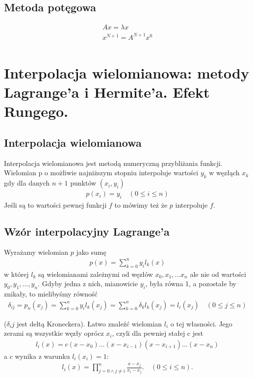 \documentclass[12pt]{article}
\begin{document}
    \subsection{Metoda potęgowa}
    \begin{align*}
        Ax = \lambda x\\
        x^{N+1} = A^{N+1} x^0\\
    \end{align*}

    \newpage

    \section{Interpolacja wielomianowa: metody Lagrange'a i Hermite'a. Efekt Rungego.}

    \subsection{Interpolacja wielomianowa}

    Interpolacja wielomianowa jest metodą numeryczną przybliżania funkcji.
    Wielomian p o możłiwie najniższym stopniu interpoluje wartości $y_k$ w węzłąch $x_k$ gdy dla danych $n+1$ punktów $(x_i, y_i)$
    \begin{align*}
        p(x_i)=y_i  \quad (0\leq i \leq n)
    \end{align*}
    Jeśli są to wartości pewnej funkcji $f$ to mówimy też że $p$ interpoluje $f$.

    \subsection{Wzór interpolacyjny Lagrange'a}

    Wyrażamy wielomian $p$ jako sumę
    \begin{align*}
        p(x)=\sum _{k=0}^{n}y_{i}l_k(x)
    \end{align*}
    w której $l_k$ są wielomianami zależnymi od węzłów $x_0,x_1, \dots x_n$ ale nie od wartości $y_0,y_1, \dots ,y_n$. Gdyby jedna z nich, mianowicie $y_i$, była równa 1, a pozostałe by znikały, to mielibyśmy równość
    \begin{align*}
        \delta_{ij} = p_n(x_j)=\sum _{k=0}^{n}y_{i}l_k(x_j)=\sum _{k=0}^{n}\delta_k l_k (x_j)=l_i(x_j) \quad (0 \leq j \leq n)
    \end{align*}

    ($\delta_ij$ jest deltą Kroneckera). Łatwo znaleźć wielomian $l_i$ o tej własności. Jego zerami są wszystkie węzły oprócz $x_i$, czyli dla pewniej stałej c jest
    \begin{align*}
        l_i(x)=c(x-x_0)\dots(x-x_{i-1})(x-x_{i+1})\dots(x-x_n)
    \end{align*}
    a $c$ wynika z warunku $l_i(x_i)=1$:
    \begin{align*}
        l_i(x)=\prod _{j=0\land j\neq i}^{n}{\frac {x-x_{j}}{x_{i}-x_{j}}}. \quad (0 \leq i \leq n).
    \end{align*}
\end{document}
